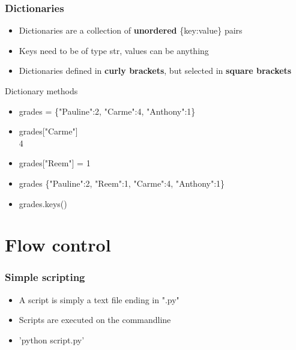 \documentclass[]{beamer}
\begin{document}

\begin{frame}
\frametitle{Dictionaries}

\begin{itemize}
\item Dictionaries are a collection of \textbf{unordered} \{key:value\} pairs 
\item Keys need to be of type str, values can be anything
\item Dictionaries defined in \textbf{curly brackets}, but selected in \textbf{square brackets}
\end{itemize}

\pause

\begin{block}{Dictionary methods}
\begin{itemize}
\item grades = \{"Pauline":2, "Carme":4, "Anthony":1\}
\item grades["Carme"]
\\ 4
\item grades["Reem"] = 1
\item grades
\newline
\{"Pauline":2, "Reem":1, "Carme":4, "Anthony":1\}
\item grades.keys()
\end{itemize}
\end{block}

\end{frame}

\section{Flow control}

\begin{frame}
\frametitle{Simple scripting}

\begin{itemize}
\item A script is simply a text file ending in ".py"
\item Scripts are executed on the commandline
\item 'python script.py'
\end{itemize}

\begin{block}{}

\end{block}

\end{frame}
\end{document}
